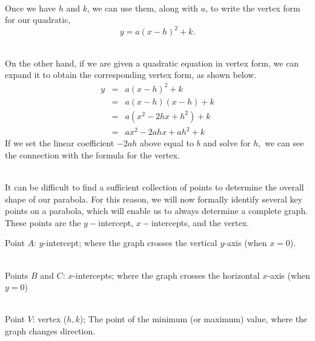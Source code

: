\documentclass[12pt]{article}
\theoremstyle{definition}
\begin{document}
\ \par
Once we have $h$ and $k$, we can use them, along with $a$, to write the vertex form for our quadratic, $$y=a(x-h)^2+k.$$
\ \par
On the other hand, if we are given a quadratic equation in vertex form, we can expand it to obtain the corresponding vertex form, as shown below.
\begin{eqnarray*}
	y & = & a(x-h)^2+k\\
	  & = & a(x-h)(x-h)+k\\
		& = & a(x^2-2hx+h^2)+k\\
		& = & ax^2-2ahx+ah^2+k
\end{eqnarray*}
If we set the linear coefficient $-2ah$ above equal to $b$ and solve for $h,$ we can see the connection with the formula for the vertex.\\
\ \par
It can be difficult to find a sufficient collection of points to determine the overall shape of our parabola.  For this reason, we will now formally identify several key points on a parabola, which will enable us to always determine a complete graph.  These points are the $y-$intercept, $x-$intercepts, and the vertex.

\begin{multicols}{2}
\begin{center}
\end{center}

\columnbreak
	Point $A$: $y$-intercept; where the graph crosses the vertical $y$-axis (when $x=0$).\\
		\ \par
  Points $B$ and $C$: $x$-intercepts; where the graph crosses the horizontal $x$-axis (when $y=0$)\\
	  \ \par
	Point $V$: vertex ($h,k$); The point of the minimum (or maximum) value, where the graph changes direction.
\end{multicols}
\end{document}
